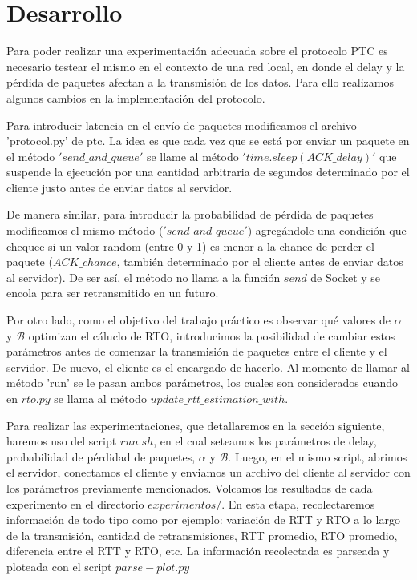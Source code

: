 \section{Desarrollo}
Para poder realizar una experimentaci\'on adecuada sobre el protocolo PTC es necesario testear el mismo en el contexto de una red local, en donde el delay y la p\'erdida de paquetes afectan a la transmisi\'on de los datos. Para ello realizamos algunos cambios en la implementaci\'on del protocolo.

Para introducir latencia en el env\'io de paquetes modificamos el archivo 'protocol.py' de ptc. La idea es que cada vez que se est\'a por enviar un paquete en el m\'etodo $'send\_and\_queue'$ se llame al m\'etodo $'time.sleep(ACK\_delay)'$ que suspende la ejecuci\'on por una cantidad arbitraria de segundos determinado por el cliente justo antes de enviar datos al servidor.

De manera similar, para introducir la probabilidad de p\'erdida de paquetes modificamos el mismo m\'etodo ($'send\_and\_queue'$) agreg\'andole una condici\'on que chequee si un valor random (entre 0 y 1) es menor a la chance de perder el paquete ($ACK\_chance$, tambi\'en determinado por el cliente antes de enviar datos al servidor). De ser as\'i, el m\'etodo no llama a la funci\'on $send$ de Socket y se encola para ser retransmitido en un futuro.

Por otro lado, como el objetivo del trabajo pr\'actico es observar qu\'e valores de $\alpha$ y $\mathcal{B}$ optimizan el c\'aluclo de RTO, introducimos la posibilidad de cambiar estos par\'ametros antes de comenzar la transmisi\'on de paquetes entre el cliente y el servidor. De nuevo, el cliente es el encargado de hacerlo. Al momento de llamar al m\'etodo 'run' se le pasan ambos par\'ametros, los cuales son considerados cuando en $rto.py$ se llama al m\'etodo $update\_rtt\_estimation\_with$.

Para realizar las experimentaciones, que detallaremos en la secci\'on siguiente, haremos uso del script $run.sh$, en el cual seteamos los par\'ametros de delay, probabilidad de p\'erdidad de paquetes, $\alpha$ y $\mathcal{B}$. Luego, en el mismo script, abrimos el servidor, conectamos el cliente y enviamos un archivo del cliente al servidor con los par\'ametros previamente mencionados. Volcamos los resultados de cada experimento en el directorio $experimentos/$. En esta etapa, recolectaremos informaci\'on de todo tipo como por ejemplo: variaci\'on de RTT y RTO a lo largo de la transmisi\'on, cantidad de retransmisiones, RTT promedio, RTO promedio, diferencia entre el RTT y RTO, etc. La informaci\'on recolectada es parseada y ploteada con el script $parse-plot.py$